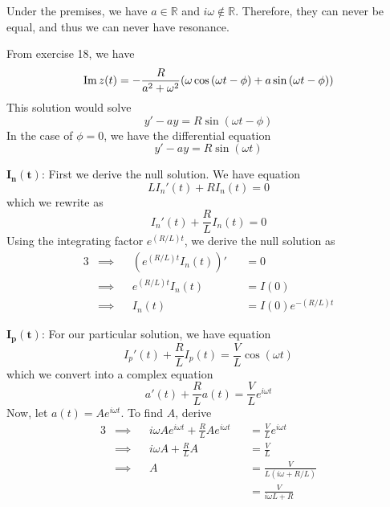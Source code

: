 \documentclass[a4paper]{article}
\begin{document}

Under the premises, we have \(a \in \mathbb{R}\) and \(i \omega \not\in\mathbb{R}\). Therefore, they can never be equal, and thus we can never have resonance.

\vspace{12pt}


From exercise 18, we have
\[
	\operatorname{Im} z \!\left( t \right) = -\frac{R}{a^{2} + \omega^{2}} \!\left( \omega \cos\left( \omega t - \phi  \right) + a \sin\left( \omega t - \phi  \right) \right) 
\]
This solution would solve
\[
	y' - ay = R \sin\left( \omega t - \phi  \right)
\]
In the case of \(\phi = 0\), we have the differential equation
\[
	y' - ay = R \sin\left( \omega t \right)
\]


\(\bm{I_{n} \!\left( t \right) }\): First we derive the null solution. We have equation
\[
	LI_{n}' \!\left( t \right) + RI_{n} \!\left( t \right)  = 0
\]
which we rewrite as
\[
	I_{n}'\!\left( t \right)  + \frac{R}{L}I_{n} \!\left( t \right)  = 0
\]
Using the integrating factor \(e^{\!\left( R/L \right) t}\), we derive the null solution as
\begin{alignat*}{3}
	&\implies && \!\left( e^{\!\left( R/L \right) t} I_{n} \!\left( t \right)  \right)' && = 0 \\
	&\implies && e^{\!\left( R/L \right) t} I_{n} \!\left( t \right) && = I \!\left( 0 \right)   \\
	&\implies && I_{n} \!\left( t \right) && = I \!\left( 0 \right) e^{-\!\left( R/L \right) t}
\end{alignat*}

\(\bm{I_{p} \!\left( t \right) }\): For our particular solution, we have equation
\[
	I_{p}' \!\left( t \right) + \frac{R}{L} I_{p} \!\left( t \right) = \frac{V}{L} \cos\left( \omega t \right)
\]
which we convert into a complex equation
\[
	a' \!\left( t \right) + \frac{R}{L} a \!\left( t \right) = \frac{V}{L} e^{i \omega t}
\]
Now, let \(a \!\left( t \right) = A e^{i \omega t}\). To find \(A\), derive
\begin{alignat*}{3}
	&\implies && i \omega A e^{i \omega t} + \frac{R}{L} A e^{i \omega t} && = \frac{V}{L} e^{i \omega t} \\
	&\implies && i \omega A + \frac{R}{L}A && = \frac{V}{L} \\ 
	&\implies && A && = \frac{V}{L \!\left( i \omega + R/L \right) } \\
	& && && = \frac{V}{i \omega L + R}
\end{alignat*}
\end{document}
